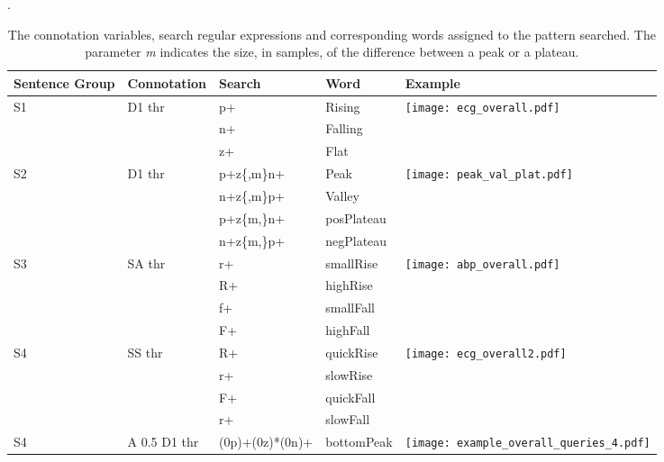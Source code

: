 \begin{table}
\begin{center}
\caption{The connotation variables, search regular expressions and corresponding words assigned to the pattern searched. The parameter \textit{m} indicates the size, in samples, of the difference between a peak or a plateau.}.
\renewcommand{\arraystretch}{1.2}
\begin{tabularx}{\linewidth}{ XXXXX } 
\toprule[1.5pt]
Sentence Group & Connotation & Search & Word & Example\\
\toprule
  \multirow{3}{1em}{S1} & \multirow{3}{3em}{D1 thr} & p+ & \textcolor{mygreen2}{Rising} &  \multirow{3}{9em}{\texttt{[image: ecg\_overall.pdf]}}\\ 
  & & n+ & \textcolor{myblue2}{Falling} & \\ 
  & & z+ & \textcolor{myorange}{Flat} & \\
\hline
 \multirow{4}{1em}{S2} & \multirow{4}{6em}{D1 thr} & p+z\{,m\}n+ & \textcolor{myblue2}{Peak} & \multirow{4}{9em}{\texttt{[image: peak\_val\_plat.pdf]}}\\
 & & n+z\{,m\}p+ & \textcolor{myorange}{Valley}\\
 & & p+z\{m,\}n+ & \textcolor{mypurple}{posPlateau}\\
 & & n+z\{m,\}p+ & \textcolor{mygreen2}{negPlateau}\\
\hline
\multirow{4}{1em}{S3} & \multirow{4}{6em}{SA thr} & r+ & \textcolor{mypurple}{smallRise} & \multirow{4}{9em}{\texttt{[image: abp\_overall.pdf]}}\\
 & & R+ & \textcolor{myblue2}{highRise}\\
 & & f+ & \textcolor{mygreen2}{smallFall}\\
 & & F+ & \textcolor{myorange}{highFall}\\
\hline
\multirow{4}{1em}{S4} & \multirow{4}{6em}{SS thr} & R+ & \textcolor{mygreen2}{quickRise} & \multirow{4}{9em}{\texttt{[image: ecg\_overall2.pdf]}}\\
  & & r+ & \textcolor{mypurple}{slowRise}\\
  & & F+ & \textcolor{myblue2}{quickFall}\\
 & & r+ & \textcolor{myorange}{slowFall}\\
\hline
\multirow{4}{1em}{S4} & \multirow{4}{6em}{A 0.5 D1 thr} & (0p)+(0z)*(0n)+ & \textcolor{mygreen2}{bottomPeak} & \multirow{4}{9em}{\texttt{[image: example\_overall\_queries\_4.pdf]}}\\

\end{tabularx}
\end{center}
\end{table}
